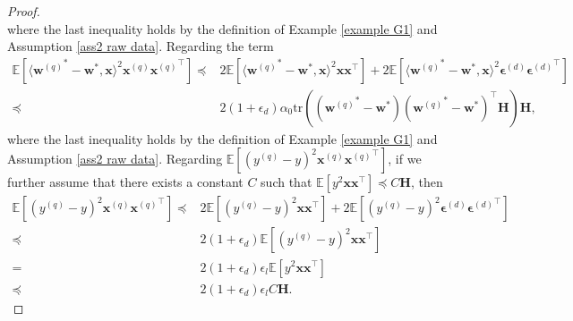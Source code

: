 \documentclass[11pt, letterpaper]{article}
\begin{document}
\begin{proof}
\begin{equation}
    \end{equation}
    where the last inequality holds by the definition of Example \ref{example G1} and Assumption \ref{ass2 raw data}. Regarding the term
    \begin{equation}
    \label{G11}
        \begin{aligned}
            \mathbb{E}\left[\langle {\mathbf{w}^{(q)}}^*- \mathbf{w}^*,\mathbf{x}\rangle^2{\mathbf{x}^{(q)}}{\mathbf{x}^{(q)}}^\top\right]\preceq &2\mathbb{E}\left[\langle {\mathbf{w}^{(q)}}^*- \mathbf{w}^*,\mathbf{x}\rangle^2{\mathbf{x}}{\mathbf{x}}^\top\right]+2\mathbb{E}\left[\langle {\mathbf{w}^{(q)}}^*- \mathbf{w}^*,\mathbf{x}\rangle^2{\boldsymbol{\epsilon}^{(d)}}{\boldsymbol{\epsilon}^{(d)}}^\top\right]\\
            \preceq &2(1+\epsilon_d)\alpha_0 \mathrm{tr}\left(({\mathbf{w}^{(q)}}^*- \mathbf{w}^*)({\mathbf{w}^{(q)}}^*- \mathbf{w}^*)^\top\mathbf{H}\right)\mathbf{H},
        \end{aligned}
    \end{equation}
    where the last inequality holds by the definition of Example \ref{example G1} and Assumption \ref{ass2 raw data}. Regarding $\mathbb{E}\left[(y^{(q)}-y)^2{\mathbf{x}^{(q)}}{\mathbf{x}^{(q)}}^\top\right]$, if we further assume that there exists a constant $C$ such that $\mathbb{E}\left[y^2 \mathbf{x}\mathbf{x}^\top\right]\preceq C\mathbf{H}$, then
    \begin{equation}
    \label{G12}
        \begin{aligned}
            \mathbb{E}\left[(y^{(q)}-y)^2{\mathbf{x}^{(q)}}{\mathbf{x}^{(q)}}^\top\right]\preceq & 2\mathbb{E}\left[(y^{(q)}-y)^2{\mathbf{x}}{\mathbf{x}}^\top\right]+2\mathbb{E}\left[(y^{(q)}-y)^2{\boldsymbol{\epsilon}^{(d)}}{\boldsymbol{\epsilon}^{(d)}}^\top\right]\\
            \preceq & 2(1+\epsilon_d)\mathbb{E}\left[(y^{(q)}-y)^2\mathbf{x}\mathbf{x}^\top\right]\\
            = & 2(1+\epsilon_d)\epsilon_l \mathbb{E}[y^2\mathbf{x}\mathbf{x}^\top]\\
            \preceq & 2(1+\epsilon_d)\epsilon_lC\mathbf{H}.
        \end{aligned}
    \end{equation}
    

\end{proof}
\end{document}
